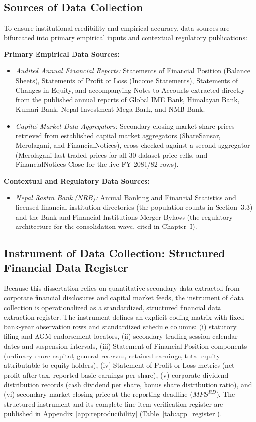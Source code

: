 \subsection{Sources of Data Collection}
To ensure institutional credibility and empirical accuracy, data sources are bifurcated into primary empirical inputs and contextual regulatory publications:

\textbf{Primary Empirical Data Sources:}
\begin{itemize}
    \item \textit{Audited Annual Financial Reports:} Statements of Financial Position (Balance Sheets), Statements of Profit or Loss (Income Statements), Statements of Changes in Equity, and accompanying Notes to Accounts extracted directly from the published annual reports of Global IME Bank, Himalayan Bank, Kumari Bank, Nepal Investment Mega Bank, and NMB Bank.
    \item \textit{Capital Market Data Aggregators:} Secondary closing market share prices retrieved from established capital market aggregators (ShareSansar, Merolagani, and FinancialNotices), cross-checked against a second aggregator (Merolagani last traded prices for all 30 dataset price cells, and FinancialNotices Close for the five FY 2081/82 rows).
\end{itemize}

\textbf{Contextual and Regulatory Data Sources:}
\begin{itemize}
    \item \textit{Nepal Rastra Bank (NRB):} Annual Banking and Financial Statistics and licensed financial institution directories (the population counts in Section~3.3) and the Bank and Financial Institutions Merger Bylaws (the regulatory architecture for the consolidation wave, cited in Chapter~I).
\end{itemize}

\subsection{Instrument of Data Collection: Structured Financial Data Register}
Because this dissertation relies on quantitative secondary data extracted from corporate financial disclosures and capital market feeds, the instrument of data collection is operationalized as a standardized, structured financial data extraction register. The instrument defines an explicit coding matrix with fixed bank-year observation rows and standardized schedule columns: (i) statutory filing and AGM endorsement locators, (ii) secondary trading session calendar dates and suspension intervals, (iii) Statement of Financial Position components (ordinary share capital, general reserves, retained earnings, total equity attributable to equity holders), (iv) Statement of Profit or Loss metrics (net profit after tax, reported basic earnings per share), (v) corporate dividend distribution records (cash dividend per share, bonus share distribution ratio), and (vi) secondary market closing price at the reporting deadline ($\mathit{MPS}^{RD}$). The structured instrument and its complete line-item verification register are published in Appendix~\ref{app:reproducibility} (Table~\ref{tab:app_register}).

